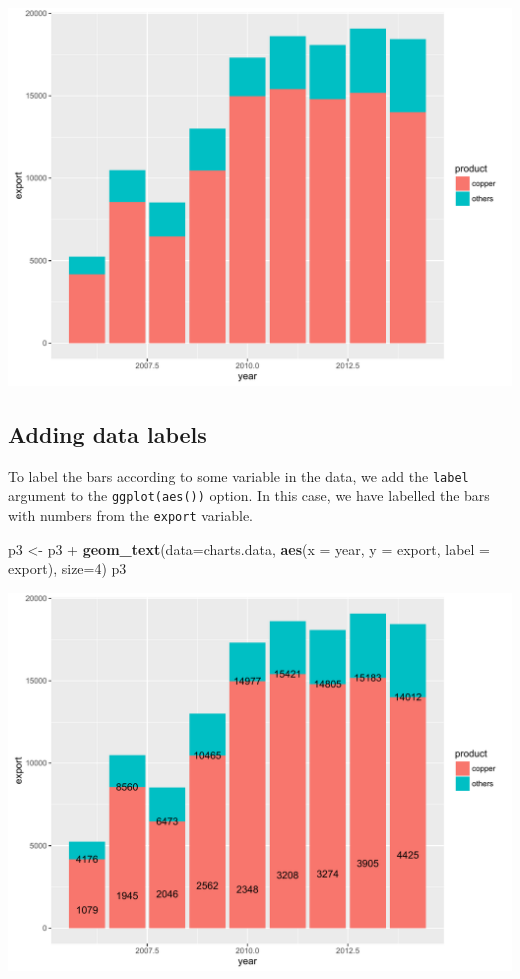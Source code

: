 \documentclass[]{article}
\newenvironment{Shaded}{\begin{snugshade}}{\end{snugshade}}
\newcommand{\KeywordTok}[1]{\textcolor[rgb]{0.13,0.29,0.53}{\textbf{{#1}}}}
\newcommand{\DataTypeTok}[1]{\textcolor[rgb]{0.13,0.29,0.53}{{#1}}}
\newcommand{\DecValTok}[1]{\textcolor[rgb]{0.00,0.00,0.81}{{#1}}}
\newcommand{\StringTok}[1]{\textcolor[rgb]{0.31,0.60,0.02}{{#1}}}
\newcommand{\NormalTok}[1]{{#1}}
\begin{document}
\begin{center}\includegraphics{0_all_posts_pdf/bar_1-1} \end{center}

\subsection{Adding data labels}\label{adding-data-labels}

To label the bars according to some variable in the data, we add the
\texttt{label} argument to the \texttt{ggplot(aes())} option. In this
case, we have labelled the bars with numbers from the \texttt{export}
variable.

\begin{Shaded}
\begin{Highlighting}[]
\NormalTok{p3 <-}\StringTok{ }\NormalTok{p3 +}\StringTok{ }\KeywordTok{geom_text}\NormalTok{(}\DataTypeTok{data=}\NormalTok{charts.data, }\KeywordTok{aes}\NormalTok{(}\DataTypeTok{x =} \NormalTok{year, }\DataTypeTok{y =} \NormalTok{export, }\DataTypeTok{label =} \NormalTok{export), }\DataTypeTok{size=}\DecValTok{4}\NormalTok{)}
\NormalTok{p3}
\end{Highlighting}
\end{Shaded}

\begin{center}\includegraphics{0_all_posts_pdf/bar_2-1} \end{center}
\end{document}
